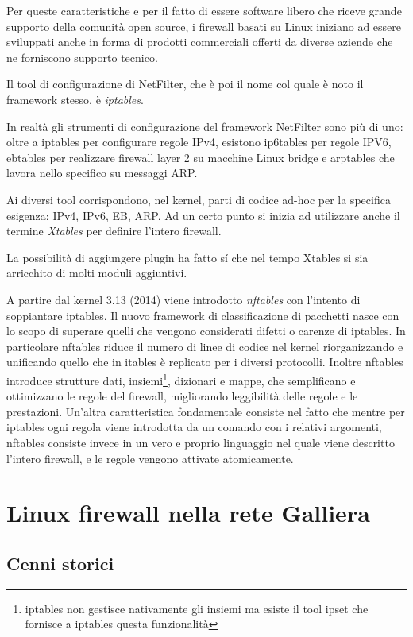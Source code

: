Per queste caratteristiche e per il fatto di essere software libero che riceve
grande supporto della comunità open source, i firewall basati su Linux
iniziano ad essere sviluppati anche in forma di prodotti commerciali offerti
da diverse aziende che ne forniscono supporto tecnico.

Il tool di configurazione di NetFilter, che è poi il nome col quale è noto il
framework stesso, è {\em iptables}.

In realtà gli strumenti di configurazione del framework NetFilter sono più di
uno: oltre a iptables per configurare regole IPv4, esistono ip6tables per
regole IPV6, ebtables per realizzare firewall layer 2 su macchine Linux bridge
e arptables che lavora nello specifico su messaggi ARP.

Ai diversi tool corrispondono, nel kernel, parti di codice ad-hoc per la
specifica esigenza: IPv4, IPv6, EB, ARP.  Ad un certo punto si inizia ad
utilizzare anche il termine {\em Xtables} per definire l'intero firewall.

La possibilità di aggiungere plugin ha fatto s\'i che nel tempo Xtables si
sia arricchito di molti moduli aggiuntivi.

A partire dal kernel 3.13 (2014) viene introdotto {\em nftables} con l'intento
di soppiantare iptables.  Il nuovo framework di classificazione di pacchetti
nasce con lo scopo di superare quelli che vengono considerati difetti o
carenze di iptables.  In particolare nftables riduce il numero di linee di
codice nel kernel riorganizzando e unificando quello che in itables è
replicato per i diversi protocolli.  Inoltre nftables introduce strutture
dati, insiemi\footnote{iptables non gestisce nativamente gli insiemi ma esiste
il tool ipset che fornisce a iptables questa funzionalità}, dizionari e mappe,
che semplificano e ottimizzano le regole del firewall, migliorando leggibilità
delle regole e le prestazioni. Un'altra caratteristica fondamentale consiste
nel fatto che mentre per iptables ogni regola viene introdotta da un comando
con i relativi argomenti, nftables consiste invece in un vero e proprio
linguaggio nel quale viene descritto l'intero firewall, e le regole vengono
attivate atomicamente.

\chapter{Linux firewall nella rete Galliera}

\section{Cenni storici}

